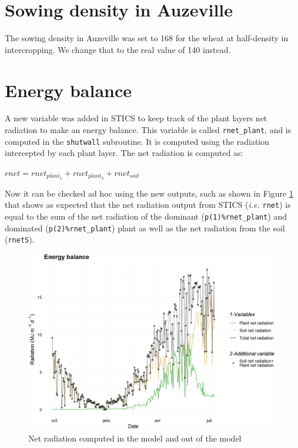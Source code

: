 \documentclass[
]{book}
\begin{document}
\hypertarget{sowing-density-in-auzeville}{%
\section{Sowing density in Auzeville}\label{sowing-density-in-auzeville}}

The sowing density in Auzeville was set to 168 for the wheat at half-density in intercropping. We change that to the real value of 140 instead.

\hypertarget{energy-balance}{%
\section{Energy balance}\label{energy-balance}}

A new variable was added in STICS to keep track of the plant layers net radiation to make an energy balance. This variable is called \texttt{rnet\_plant}, and is computed in the \texttt{shutwall} subroutine. It is computed using the radiation intercepted by each plant layer. The net radiation is computed as:

\(rnet= rnet_{plant_1}+rnet_{plant_2}+rnet_{soil}\)

Now it can be checked ad hoc using the new outputs, such as shown in Figure \ref{fig:netradiation} that shows as expected that the net radiation output from STICS (\emph{i.e.} \texttt{rnet}) is equal to the sum of the net radiation of the dominant (\texttt{p(1)\%rnet\_plant}) and dominated (\texttt{p(2)\%rnet\_plant}) plant as well as the net radiation from the soil (\texttt{rnetS}).

\begin{figure}
\centering
\includegraphics{img/energy_balance.png}
\caption{\label{fig:netradiation}Net radiation computed in the model and out of the model}
\end{figure}
\end{document}
